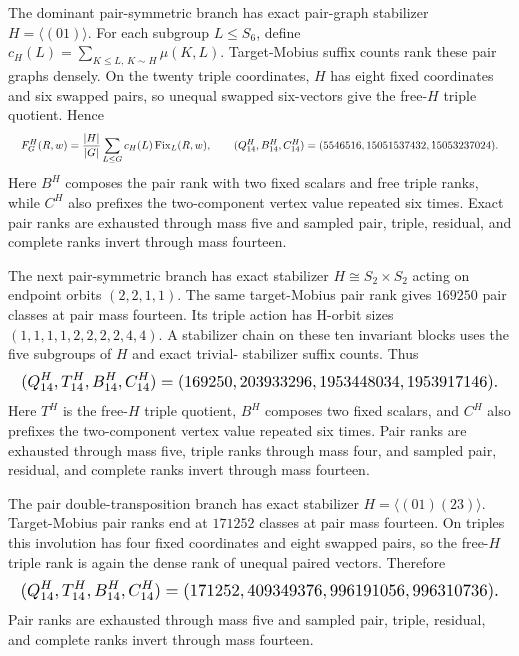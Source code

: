 \documentclass{article}
\newcommand{\fitmath}[1]{\resizebox{0.99\linewidth}{!}{$\displaystyle #1$}}
\begin{document}
The dominant pair-symmetric branch has exact pair-graph stabilizer
$H=\langle(01)\rangle$. For each subgroup $L\leq S_6$, define
$c_H(L)=\sum_{K\leq L,\,K\sim H}\mu(K,L)$. Target-Mobius suffix counts rank
these pair graphs densely. On the twenty triple coordinates, $H$ has eight fixed
coordinates and six swapped pairs, so unequal swapped six-vectors give the
free-$H$ triple quotient. Hence
\begin{equation}
  \fitmath{%
    F^H_G(R,w)=\frac{|H|}{|G|}\sum_{L\leq G}c_H(L)
      \operatorname{Fix}_L(R,w),\qquad
    (Q^H_{14},B^H_{14},C^H_{14})
      =(5546516,15051537432,15053237024).
  }
  \label{eq:optimization-crazy-sextuple-s6-pair-transposition-ranking}
\end{equation}
Here $B^H$ composes the pair rank with two fixed scalars and free triple ranks,
while $C^H$ also prefixes the two-component vertex value repeated six times.
Exact pair ranks are exhausted through mass five and sampled pair, triple,
residual, and complete ranks invert through mass fourteen.

The next pair-symmetric branch has exact stabilizer
$H\cong S_2\times S_2$ acting on endpoint orbits $(2,2,1,1)$. The same
target-Mobius pair rank gives $169250$ pair classes at pair mass fourteen. Its
triple action has H-orbit sizes $(1,1,1,1,2,2,2,2,4,4)$. A stabilizer chain on
these ten invariant blocks uses the five subgroups of $H$ and exact trivial-
stabilizer suffix counts. Thus
\begin{equation}
  \fitmath{%
    (Q^{H}_{14},T^{H}_{14},B^{H}_{14},C^{H}_{14})
      =(169250,203933296,1953448034,1953917146).
  }
  \label{eq:optimization-crazy-sextuple-s6-pair-s2s2-ranking}
\end{equation}
Here $T^H$ is the free-$H$ triple quotient, $B^H$ composes two fixed scalars,
and $C^H$ also prefixes the two-component vertex value repeated six times.
Pair ranks are exhausted through mass five, triple ranks through mass four, and
sampled pair, residual, and complete ranks invert through mass fourteen.

The pair double-transposition branch has exact stabilizer
$H=\langle(01)(23)\rangle$. Target-Mobius pair ranks end at $171252$ classes at
pair mass fourteen. On triples this involution has four fixed coordinates and
eight swapped pairs, so the free-$H$ triple rank is again the dense rank of
unequal paired vectors. Therefore
\begin{equation}
  \fitmath{%
    (Q^H_{14},T^H_{14},B^H_{14},C^H_{14})
      =(171252,409349376,996191056,996310736).
  }
  \label{eq:optimization-crazy-sextuple-s6-pair-double-transposition-ranking}
\end{equation}
Pair ranks are exhausted through mass five and sampled pair, triple, residual,
and complete ranks invert through mass fourteen.
\end{document}
